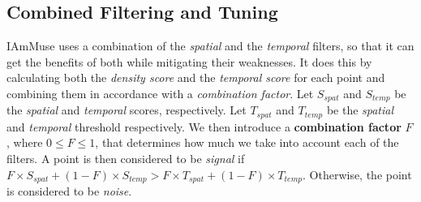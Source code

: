 % 


\subsection{Combined Filtering and Tuning}
\label{sub-section: tracking method - data filtering - combined filtering and tuning}

IAmMuse uses a combination of the \textit{spatial} and the \textit{temporal} filters, so that it can get the benefits of both while mitigating their weaknesses.
It does this by calculating both the \textit{density score} and the \textit{temporal score} for each point and combining them in accordance with a \textit{combination factor}.
Let $S_{spat}$ and $S_{temp}$ be the \textit{spatial} and \textit{temporal} scores, respectively.
Let $T_{spat}$ and $T_{temp}$ be the \textit{spatial} and \textit{temporal} threshold respectively.
We then introduce a \textbf{combination factor} $F$, where $0 \leq F \leq 1$, that determines how much we take into account each of the filters.
A point is then considered to be \textit{signal} if $F \times S_{spat} + (1 - F) \times S_{temp} > F \times T_{spat} + (1 - F) \times T_{temp} $.
Otherwise, the point is considered to be \textit{noise}.

